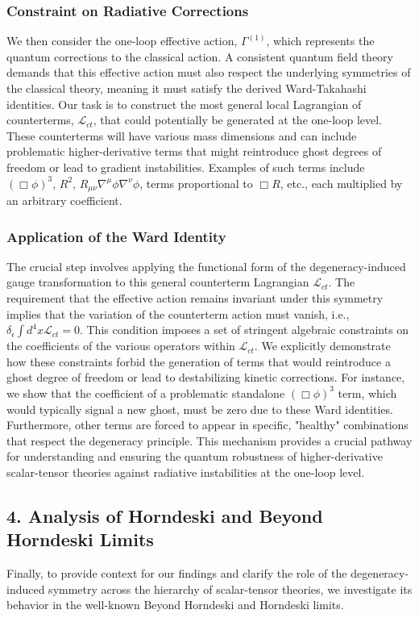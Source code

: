 \documentclass[twocolumn]{aastex631}
\begin{document}
\subsubsection*{Constraint on Radiative Corrections}
We then consider the one-loop effective action, $\Gamma^{(1)}$, which represents the quantum corrections to the classical action. A consistent quantum field theory demands that this effective action must also respect the underlying symmetries of the classical theory, meaning it must satisfy the derived Ward-Takahashi identities. Our task is to construct the most general local Lagrangian of counterterms, $\mathcal{L}_{ct}$, that could potentially be generated at the one-loop level. These counterterms will have various mass dimensions and can include problematic higher-derivative terms that might reintroduce ghost degrees of freedom or lead to gradient instabilities. Examples of such terms include $(\Box\phi)^3$, $R^2$, $R_{\mu\nu}\nabla^\mu\phi\nabla^\nu\phi$, terms proportional to $\Box R$, etc., each multiplied by an arbitrary coefficient.

\subsubsection*{Application of the Ward Identity}
The crucial step involves applying the functional form of the degeneracy-induced gauge transformation to this general counterterm Lagrangian $\mathcal{L}_{ct}$. The requirement that the effective action remains invariant under this symmetry implies that the variation of the counterterm action must vanish, i.e., $\delta_\epsilon \int d^4x \mathcal{L}_{ct} = 0$. This condition imposes a set of stringent algebraic constraints on the coefficients of the various operators within $\mathcal{L}_{ct}$. We explicitly demonstrate how these constraints forbid the generation of terms that would reintroduce a ghost degree of freedom or lead to destabilizing kinetic corrections. For instance, we show that the coefficient of a problematic standalone $(\Box\phi)^3$ term, which would typically signal a new ghost, must be zero due to these Ward identities. Furthermore, other terms are forced to appear in specific, "healthy" combinations that respect the degeneracy principle. This mechanism provides a crucial pathway for understanding and ensuring the quantum robustness of higher-derivative scalar-tensor theories against radiative instabilities at the one-loop level.

\subsection*{4. Analysis of Horndeski and Beyond Horndeski Limits}
Finally, to provide context for our findings and clarify the role of the degeneracy-induced symmetry across the hierarchy of scalar-tensor theories, we investigate its behavior in the well-known Beyond Horndeski and Horndeski limits.
\end{document}
